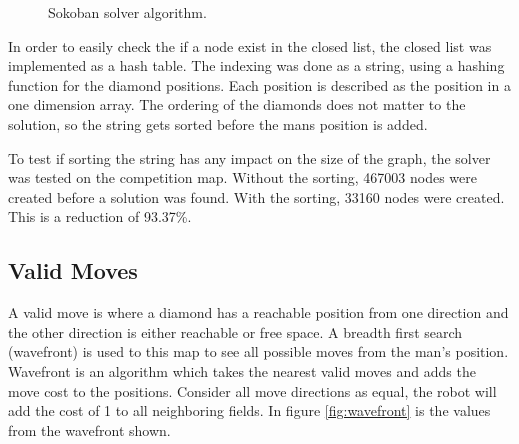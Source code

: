 \begin{figure}[h]
\renewcommand\figurename{Code Section}
\centering
{}
 \caption{Sokoban solver algorithm.}
 \label{code:sokoban_solver}
\end{figure}
In order to easily check the if a node exist in the closed list, the closed list was implemented as a hash table.
The indexing was done as a string, using a hashing function for the diamond positions.
Each position is described as the position in a one dimension array.
The ordering of the diamonds does not matter to the solution, so the string gets sorted before the mans position is added.

To test if sorting the string has any impact on the size of the graph, the solver was tested on the competition map.
Without the sorting, 467003 nodes were created before a solution was found.
With the sorting, 33160 nodes were created. 
This is a reduction of 93.37\%.

\subsection{Valid Moves}
A valid move is where a diamond has a reachable position from one direction and the other direction is either reachable or free space.
A breadth first search (wavefront) is used to this map to see all possible moves from the man's position.
Wavefront is an algorithm which takes the nearest valid moves and adds the move cost to the positions.
Consider all move directions as equal, the robot will add the cost of 1 to all neighboring fields.
In figure \ref{fig:wavefront} is the values from the wavefront shown.

